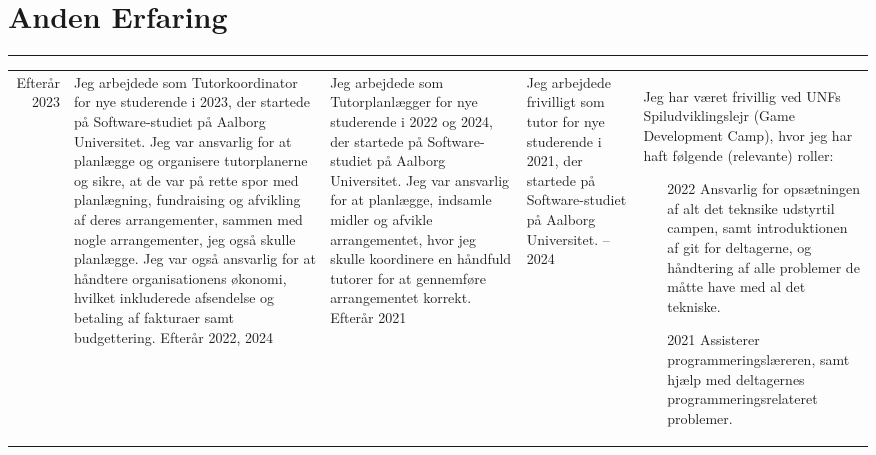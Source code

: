 \documentclass[a4paper]{report}
\def\secsep{\hrule width5cm}
\begin{document}
\section*{Anden Erfaring}
\secsep
\begin{longtabu} to \textwidth {r|X}
Efterår 2023 & 
Jeg arbejdede som Tutorkoordinator for nye studerende i 2023, der startede på Software-studiet på Aalborg Universitet.
Jeg var ansvarlig for at planlægge og organisere tutorplanerne og sikre, at de var på rette spor med planlægning, fundraising og afvikling af deres arrangementer, sammen med nogle arrangementer, jeg også skulle planlægge.
Jeg var også ansvarlig for at håndtere organisationens økonomi, hvilket inkluderede afsendelse og betaling af fakturaer samt budgettering.
\n
Efterår 2022, 2024 & 
Jeg arbejdede som Tutorplanlægger for nye studerende i 2022 og 2024, der startede på Software-studiet på Aalborg Universitet.
Jeg var ansvarlig for at planlægge, indsamle midler og afvikle arrangementet, hvor jeg skulle koordinere en håndfuld tutorer for at gennemføre arrangementet korrekt.
\n
Efterår 2021 & 
Jeg arbejdede frivilligt som tutor for nye studerende i 2021, der startede på Software-studiet på Aalborg Universitet.
--2024 & 
    Jeg har været frivillig ved UNFs Spiludviklingslejr (Game Development Camp), hvor jeg har haft følgende (relevante) roller:
\begin{itemize}[leftmargin=4em]
    \item[2022]  Ansvarlig for opsætningen af alt det teknsike
            udstyrtil campen, samt introduktionen af git for deltagerne, og håndtering
            af alle problemer de måtte have med al det tekniske.
    \item[2021]  Assisterer programmeringslæreren, samt
            hjælp med deltagernes programmeringsrelateret problemer.
\end{itemize}
\end{longtabu}
\end{document}

